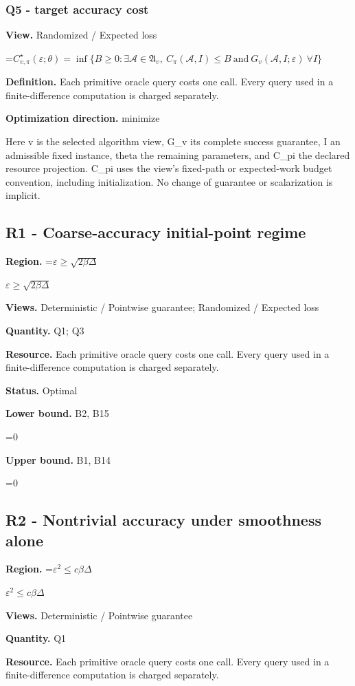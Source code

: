 \documentclass[10pt,a4paper]{article}
\newcommand{\AtlasMath}[1]{\par\begingroup\centering\setbox0=\hbox{$\displaystyle #1$}\ifdim\wd0>1.4\linewidth\typeout{ATLAS WIDE FORMULA: \the\wd0}\fi\ifdim\wd0>\linewidth\resizebox{\linewidth}{!}{\box0}\else\box0\fi\par\endgroup}
\newcommand{\AtlasInlineMath}[1]{\begingroup\setbox0=\hbox{$#1$}\ifdim\wd0>.4\linewidth\endgroup\AtlasMath{#1}\else\endgroup$#1$\fi}
\begin{document}
\subsubsection{Q5 - target accuracy cost}
\textbf{View.} Randomized / Expected loss

\AtlasMath{C^\star_{v,\pi}(\varepsilon;\theta)=\inf\{B\ge0:\exists\mathcal A\in\mathfrak A_v,\ C_\pi(\mathcal A,I)\le B\ \text{and}\ G_v(\mathcal A,I;\varepsilon)\ \forall I\}}
\textbf{Definition.} Each primitive oracle query costs one call. Every query used in a finite-difference computation is charged separately.

\textbf{Optimization direction.} minimize

Here v is the selected algorithm view, G\_v its complete success guarantee, I an admissible fixed instance, theta the remaining parameters, and C\_pi the declared resource projection. C\_pi uses the view's fixed-path or expected-work budget convention, including initialization. No change of guarantee or scalarization is implicit.

\subsection{R1 - Coarse-accuracy initial-point regime}
\textbf{Region.} \AtlasInlineMath{\varepsilon\ge\sqrt{2\beta\Delta}}

\textbf{Views.} Deterministic / Pointwise guarantee; Randomized / Expected loss

\textbf{Quantity.} Q1; Q3

\textbf{Resource.} Each primitive oracle query costs one call. Every query used in a finite-difference computation is charged separately.

\textbf{Status.} Optimal

\textbf{Lower bound.} B2, B15

\AtlasMath{0}
\textbf{Upper bound.} B1, B14

\AtlasMath{0}
\subsection{R2 - Nontrivial accuracy under smoothness alone}
\textbf{Region.} \AtlasInlineMath{\varepsilon^2\le c\beta\Delta}

\textbf{Views.} Deterministic / Pointwise guarantee

\textbf{Quantity.} Q1

\textbf{Resource.} Each primitive oracle query costs one call. Every query used in a finite-difference computation is charged separately.
\end{document}

